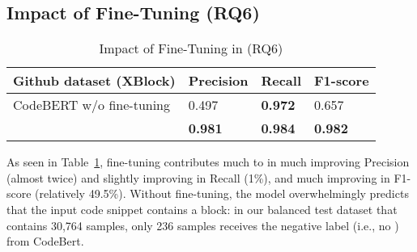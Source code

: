 \subsection{Impact of Fine-Tuning (RQ6)}
\label{sec:rq6}

\begin{table}[h]%
  \caption{Impact of Fine-Tuning in {\tool} (RQ6)}
  \vspace{-12pt}
  \small
	\begin{center}
		\renewcommand{\arraystretch}{1}
		\begin{tabular}{| p{3.15cm}<{\centering} | p{1.2cm}<{\centering} | p{1.2cm}<{\centering}| p{1.2cm}<{\centering}|}
		  \hline
			Github dataset (XBlock)  & Precision  &  Recall & F1-score \\
			\hline
			CodeBERT w/o fine-tuning & 0.497  & \textbf{0.972}   & 0.657\\
			\hline
			\tool   &  \textbf{0.981} &  {\bf 0.984} & \textbf{0.982}\\
			\hline
		\end{tabular}
		\label{tab:codebert}
	\end{center}
\end{table}

As seen in Table~\ref{tab:codebert}, fine-tuning contributes much to
{\tool} in much improving Precision (almost twice) and slightly
improving in Recall (1\%), and much improving in F1-score (relatively
49.5\%). Without fine-tuning, the model 
overwhelmingly predicts that the input code snippet contains a
 block: in our balanced test dataset that contains
30,764 samples, only 236 samples receives the negative label (i.e., no
) from CodeBert.
